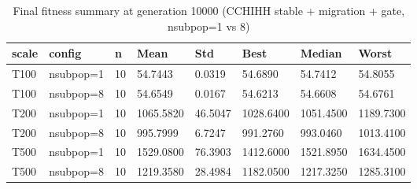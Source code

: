 \begin{table}[htbp]
\centering
\caption{Final fitness summary at generation 10000 (CCHIHH stable + migration + gate, nsubpop=1 vs 8)}
\label{tab:nsubpop_final}
\begin{tabular}{llllllll}
\toprule
scale & config & n & Mean & Std & Best & Median & Worst \\
\midrule
T100 & nsubpop=1 & 10 & 54.7443 & 0.0319 & 54.6890 & 54.7412 & 54.8055 \\
T100 & nsubpop=8 & 10 & 54.6549 & 0.0167 & 54.6213 & 54.6608 & 54.6761 \\
T200 & nsubpop=1 & 10 & 1065.5820 & 46.5047 & 1028.6400 & 1051.4500 & 1189.7300 \\
T200 & nsubpop=8 & 10 & 995.7999 & 6.7247 & 991.2760 & 993.0460 & 1013.4100 \\
T500 & nsubpop=1 & 10 & 1529.0800 & 76.3903 & 1412.6000 & 1521.8950 & 1634.4500 \\
T500 & nsubpop=8 & 10 & 1219.3580 & 28.4984 & 1182.0500 & 1217.3250 & 1285.3100 \\
\bottomrule
\end{tabular}
\end{table}
